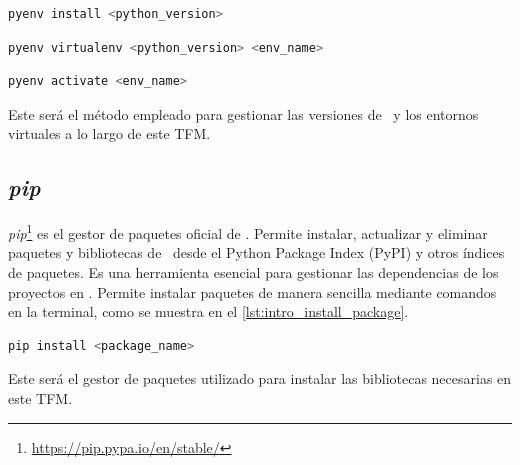 \vspace{0.2cm}
\begin{lstlisting}[language=bash, caption={Instalación de una versión específica de \python\ con \pyenv}, label={lst:install_pyenv_python}]
pyenv install <python_version>
\end{lstlisting}
\begin{lstlisting}[language=bash, caption={Creación de un entorno virtual con \pyenv}, label={lst:install_pyenv_virtualenv}]
pyenv virtualenv <python_version> <env_name>
\end{lstlisting}
\begin{lstlisting}[language=bash, caption={Activación de un entorno virtual con \pyenv}, label={lst:activate_pyenv_virtualenv}]
pyenv activate <env_name>
\end{lstlisting}

Este será el método empleado para gestionar las versiones de \python\ y los entornos virtuales a lo largo de este TFM.

\newpage
\subsection{\textit{pip}} \label{sec:intro_pip}
\textit{pip}\footnote{\url{https://pip.pypa.io/en/stable/}} es el gestor de paquetes oficial de \python. Permite instalar, actualizar y
eliminar paquetes y bibliotecas de \python\ desde el Python Package Index (PyPI) y otros índices de paquetes.
Es una herramienta esencial para gestionar las dependencias de los proyectos en \python. Permite instalar paquetes de manera
sencilla mediante comandos en la terminal, como se muestra en el \autoref{lst:intro_install_package}.
\begin{lstlisting}[language=bash, caption={Instalación de un paquete con \textit{pip}}, label={lst:intro_install_package}]
pip install <package_name>
\end{lstlisting}

Este será el gestor de paquetes utilizado para instalar las bibliotecas necesarias en este TFM.


